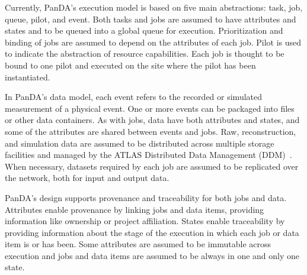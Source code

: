 Currently, PanDA's execution model is based on five main abstractions: task,
job, queue, pilot, and event. Both tasks and jobs are assumed to have attributes
and states and to be queued into a global queue for execution. Prioritization
and binding of jobs are assumed to depend on the attributes of each job. Pilot
is used to indicate the abstraction of resource capabilities. Each job is
thought to be bound to one pilot and executed on the site where the pilot has
been instantiated.

In PanDA's data model, each event refers to the recorded or simulated
measurement of a physical event. One or more events can be packaged into files
or other data containers. As with jobs, data have both attributes and states,
and some of the attributes are shared between events and jobs. Raw,
reconstruction, and simulation data are assumed to be distributed across
multiple storage facilities and managed by the ATLAS Distributed Data Management
(DDM)~\cite{garonne2012atlas}. When necessary, datasets required by each job are
assumed to be replicated over the network, both for input and output data.

PanDA's design supports provenance and traceability for both jobs and data.
Attributes enable provenance by linking jobs and data items, providing
information like ownership or project affiliation. States enable traceability by
providing information about the stage of the execution in which each job or data
item is or has been. Some attributes are assumed to be immutable across
execution and jobs and data items are assumed to be always in one and only one
state.





